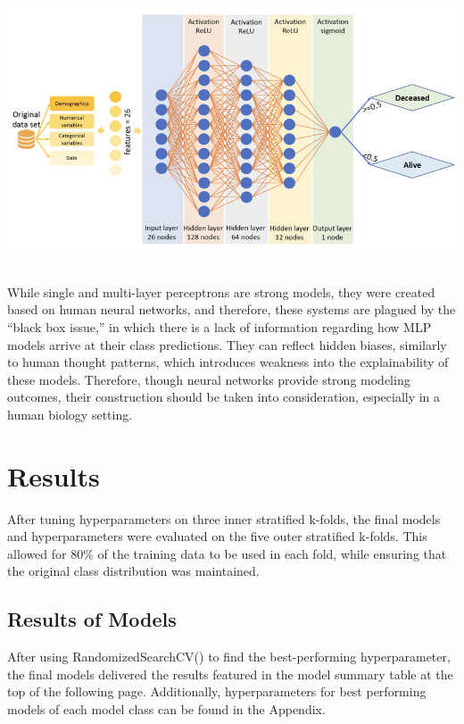 \documentclass{article}
\begin{document}
\begin{center}
    \includegraphics[scale = .25]{images/RELU.png}
    ~\cite{RELUImage}
\end{center}

While single and multi-layer perceptrons are strong models, they were created based on human neural networks, and therefore, these systems are plagued by the “black box issue,” in which there is a lack of information regarding how MLP models arrive at their class predictions. They can reflect hidden biases, similarly to human thought patterns, which introduces weakness into the explainability of these models. Therefore, though neural networks provide strong modeling outcomes, their construction should be taken into consideration, especially in a human biology setting. 

\section{Results}
After tuning hyperparameters on three inner stratified k-folds, the final models and hyperparameters were evaluated on the five outer stratified k-folds. This allowed for 80\% of the training data to be used in each fold, while ensuring that the original class distribution was maintained. 

\subsection{Results of Models}

After using RandomizedSearchCV() to find the best-performing hyperparameter, the final models delivered the results featured in the model summary table at the top of the following page. Additionally, hyperparameters for best performing models of each model class can be found in the Appendix.
\end{document}
